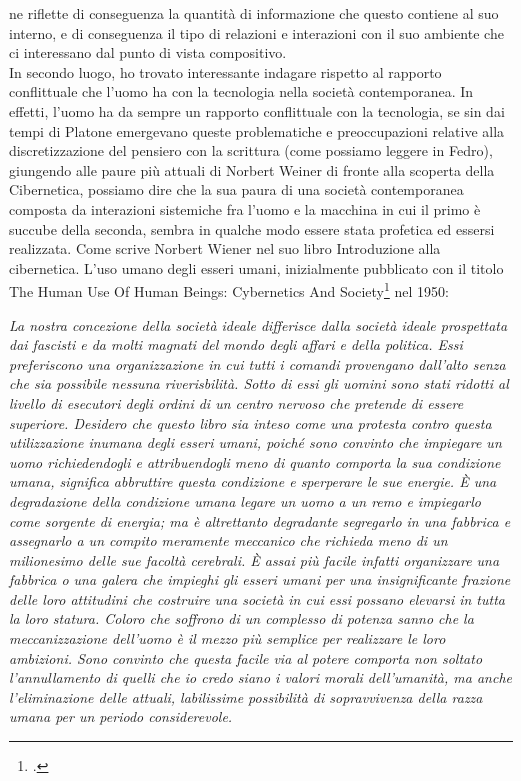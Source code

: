 ne riflette di conseguenza la quantità di informazione che questo contiene al suo interno,
e di conseguenza il tipo di relazioni e interazioni con il suo ambiente che 
ci interessano dal punto di vista compositivo.\\
In secondo luogo, ho trovato interessante indagare rispetto al rapporto conflittuale che l'uomo ha con la tecnologia
nella società contemporanea. 
In effetti, l'uomo ha da sempre un rapporto conflittuale con la tecnologia,
se sin dai tempi di Platone emergevano queste problematiche e preoccupazioni
relative alla discretizzazione del pensiero con la scrittura
(come possiamo leggere in Fedro), 
giungendo alle paure più attuali di Norbert Weiner di fronte
alla scoperta della Cibernetica, possiamo dire che la sua paura di una società contemporanea 
composta da interazioni sistemiche fra l'uomo e la macchina
in cui il primo è succube della seconda, sembra in qualche modo essere stata profetica ed essersi realizzata.
Come scrive Norbert Wiener nel suo libro Introduzione alla cibernetica. L'uso umano degli esseri umani,
inizialmente pubblicato con il titolo The Human Use Of Human Beings: Cybernetics And Society\footcite{wiener_introduzione_nodate}
nel 1950:

\begin{center}
    \vspace{0.5cm}
    \textit{La nostra concezione della società ideale differisce dalla società ideale
    prospettata dai fascisti e da molti magnati del mondo degli affari 
    e della politica.
    Essi preferiscono una organizzazione in cui tutti i comandi
    provengano dall'alto senza che sia possibile nessuna riverisbilità.
    Sotto di essi gli uomini sono stati ridotti al livello di esecutori degli ordini
    di un centro nervoso che pretende di essere superiore.
    Desidero che questo libro sia inteso come una protesta contro questa
    utilizzazione inumana degli esseri umani, poiché sono convinto che impiegare
    un uomo richiedendogli e attribuendogli meno di quanto comporta la sua condizione umana,
    significa abbruttire questa condizione e sperperare le sue energie.
    È una degradazione della condizione umana legare un uomo a un remo e impiegarlo come
    sorgente di energia; ma è altrettanto degradante segregarlo in una fabbrica
    e assegnarlo a un compito meramente meccanico che richieda meno di un milionesimo
    delle sue facoltà cerebrali. È assai più facile infatti
    organizzare una fabbrica o una galera che impieghi gli esseri umani
    per una insignificante frazione delle loro attitudini che costruire una 
    società in cui essi possano elevarsi in tutta la loro statura.
    Coloro che soffrono di un complesso di potenza sanno che la meccanizzazione 
    dell'uomo è il mezzo più semplice per realizzare le loro ambizioni.
    Sono convinto che questa facile via al potere comporta non soltato l'annullamento 
    di quelli che io credo siano i valori morali dell'umanità,
    ma anche l'eliminazione delle attuali, labilissime possibilità di
    sopravvivenza della razza umana per un periodo considerevole.
    }
\vspace{0.5cm}
\end{center}

